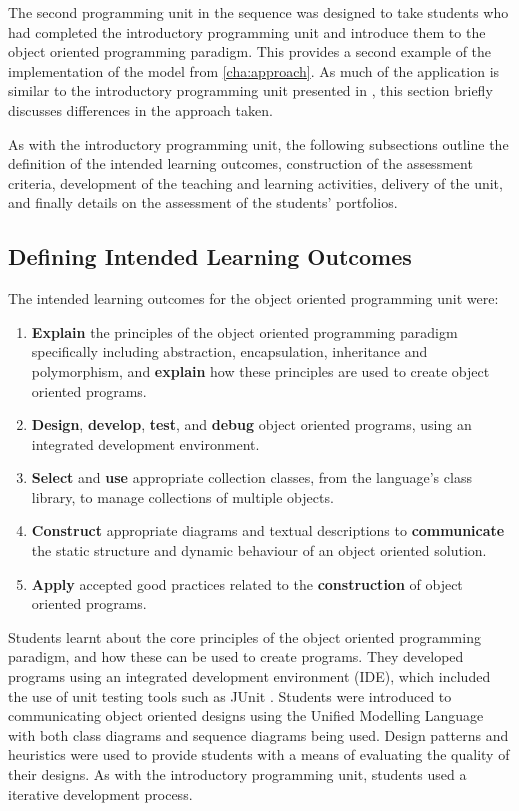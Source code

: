 The second programming unit in the sequence was designed to take students who had completed the introductory programming unit and introduce them to the object oriented programming paradigm. This provides a second example of the implementation of the model from \cref{cha:approach}. As much of the application is similar to the introductory programming unit presented in , this section briefly discusses differences in the approach taken.

As with the introductory programming unit, the following subsections outline the definition of the intended learning outcomes, construction of the assessment criteria, development of the teaching and learning activities, delivery of the unit, and finally details on the assessment of the students' portfolios.


\subsection{Defining Intended Learning Outcomes} %
\label{sub:oop_defining_intended_learning_outcomes}

The intended learning outcomes for the object oriented programming unit were:
\begin{enumerate}
	\item \textbf{Explain} the principles of the object oriented programming paradigm specifically including abstraction, encapsulation, inheritance and polymorphism, and \textbf{explain} how these principles are used to create object oriented programs.
	\item \textbf{Design}, \textbf{develop}, \textbf{test}, and \textbf{debug} object oriented programs, using an integrated development environment.
	\item \textbf{Select} and \textbf{use} appropriate collection classes, from the language's class library, to manage collections of multiple objects.
	\item \textbf{Construct} appropriate diagrams and textual descriptions to \textbf{communicate} the static structure and dynamic behaviour of an object oriented solution.
	\item \textbf{Apply} accepted good practices related to the \textbf{construction} of object oriented programs.
\end{enumerate}

Students learnt about the core principles of the object oriented programming paradigm, and how these can be used to create programs. They developed programs using an integrated development environment (IDE), which included the use of unit testing tools such as JUnit \cite{JUnit}. Students were introduced to communicating object oriented designs using the Unified Modelling Language \cite{OMG:2011} with both class diagrams and sequence diagrams being used. Design patterns and heuristics were used to provide students with a means of evaluating the quality of their designs. As with the introductory programming unit, students used a iterative development process. 

